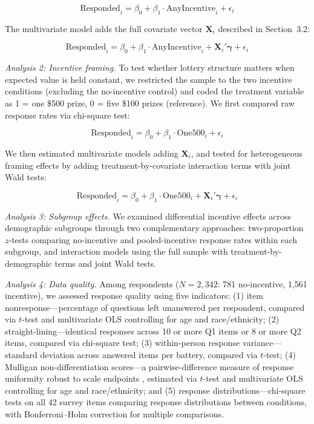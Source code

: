 \begin{equation}
  \text{Responded}_i = \beta_0 + \beta_1 \cdot \text{AnyIncentive}_i + \epsilon_i
\end{equation}

The multivariate model adds the full covariate vector $\mathbf{X}_i$ described in
Section~3.2:

\begin{equation}
  \text{Responded}_i = \beta_0 + \beta_1 \cdot \text{AnyIncentive}_i +
  \mathbf{X}_i'\boldsymbol{\gamma} + \epsilon_i
\end{equation}

\emph{Analysis 2: Incentive framing.} To test whether lottery structure matters when
expected value is held constant, we restricted the sample to the two incentive conditions
(excluding the no-incentive control) and coded the treatment variable as 1 = one \$500
prize, 0 = five \$100 prizes (reference). We first compared raw response rates via
chi-square test:

\begin{equation}
  \text{Responded}_i = \beta_0 + \beta_1 \cdot \text{One500}_i + \epsilon_i
\end{equation}

We then estimated multivariate models adding $\mathbf{X}_i$, and tested for
heterogeneous framing effects by adding treatment-by-covariate interaction terms with
joint Wald tests:

\begin{equation}
  \text{Responded}_i = \beta_0 + \beta_1 \cdot \text{One500}_i +
  \mathbf{X}_i'\boldsymbol{\gamma} + \epsilon_i
\end{equation}

\emph{Analysis 3: Subgroup effects.} We examined differential incentive effects across
demographic subgroups through two complementary approaches: two-proportion $z$-tests
comparing no-incentive and pooled-incentive response rates within each subgroup, and
interaction models using the full sample with treatment-by-demographic terms and joint
Wald tests.

\emph{Analysis 4: Data quality.} Among respondents ($N = 2{,}342$: 781 no-incentive,
1,561 incentive), we assessed response quality using five indicators: (1) item
nonresponse---percentage of questions left unanswered per respondent, compared via
$t$-test and multivariate OLS controlling for age and race/ethnicity; (2)
straight-lining---identical responses across 10 or more Q1 items or 8 or more Q2 items,
compared via chi-square test; (3) within-person response variance---standard deviation
across answered items per battery, compared via $t$-test; (4) Mulligan
non-differentiation scores---a pairwise-difference measure of response uniformity robust
to scale endpoints \parencite{Anand.etal2013}, estimated via $t$-test and multivariate OLS
controlling for age and race/ethnicity; and (5) response distributions---chi-square tests
on all 42 survey items comparing response distributions between conditions, with
Bonferroni--Holm correction for multiple comparisons.


